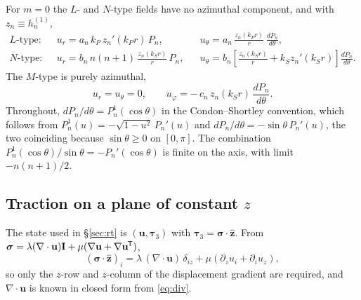 \documentclass[11pt,a4paper]{article}
\newcommand{\bI}{\mathbf{I}}
\newcommand{\bu}{\mathbf{u}}
\newcommand{\bta}{\boldsymbol{\tau}}
\newcommand{\bsig}{\boldsymbol{\sigma}}
\newcommand{\zhat}{\hat{\mathbf{z}}}
\newcommand{\tp}{^{\mkern-1.5mu\mathsf{T}}}
\begin{document}
For $m=0$ the $L$- and $N$-type fields have no azimuthal component, and with
$z_n \equiv h^{(1)}_n$,
\begin{align}
  \text{$L$-type:}\quad
    & u_r = a_n\,k_P\,z_n'(k_P r)\,P_n, &
    & u_\theta = a_n\,\frac{z_n(k_P r)}{r}\,\frac{dP_n}{d\theta}, \label{eq:uL}\\[2pt]
  \text{$N$-type:}\quad
    & u_r = b_n\,n(n+1)\,\frac{z_n(k_S r)}{r}\,P_n, &
    & u_\theta = b_n\!\left[\frac{z_n(k_S r)}{r} + k_S z_n'(k_S r)\right]\!\frac{dP_n}{d\theta}. \label{eq:uN}
\end{align}
The $M$-type is purely azimuthal,
\begin{equation}\label{eq:uM}
  u_r = u_\theta = 0, \qquad u_\varphi = -\,c_n\,z_n(k_S r)\,\frac{dP_n}{d\theta}.
\end{equation}
Throughout, $dP_n/d\theta = P_n^1(\cos\theta)$ in the Condon--Shortley
convention, which follows from $P_n^1(u) = -\sqrt{1-u^2}\,P_n'(u)$ and
$dP_n/d\theta = -\sin\theta\,P_n'(u)$, the two coinciding because
$\sin\theta\ge0$ on $[0,\pi]$.  The combination $P_n^1(\cos\theta)/\sin\theta =
-P_n'(\cos\theta)$ is finite on the axis, with limit $-n(n+1)/2$.

\subsection{Traction on a plane of constant \texorpdfstring{$z$}{z}}\label{sec:traction}

The state used in \S\ref{sec:rt} is $(\bu,\bta_3)$ with
$\bta_3 = \bsig\cdot\zhat$.  From
$\bsig = \lambda(\nabla\cdot\bu)\bI + \mu(\nabla\bu + \nabla\bu\tp)$,
\begin{equation}\label{eq:tau3}
  (\bsig\cdot\zhat)_i = \lambda\,(\nabla\cdot\bu)\,\delta_{iz}
   + \mu\left(\partial_z u_i + \partial_i u_z\right),
\end{equation}
so only the $z$-row and $z$-column of the displacement gradient are required,
and $\nabla\cdot\bu$ is known in closed form from \eqref{eq:div}.
\end{document}
